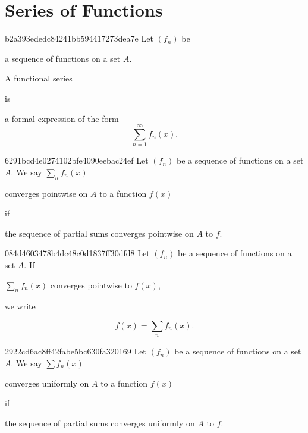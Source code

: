 \section{Series of Functions} %
\begin{note}{b2a393ededc84241bb594417273dea7e}
    Let \({ (f_n) }\) be \begin{icloze}{3}a sequence of functions on a set \({ A }\).\end{icloze}
    \begin{icloze}{2}A functional series\end{icloze} is
    \begin{icloze}{1}
        a formal expression of the form
        \[
            \sum_{n=1}^{\infty} f_n(x).
        \]
    \end{icloze}
\end{note}

\begin{note}{6291bcd4e0274102bfe4090eebac24ef}
    Let \({ (f_n) }\) be a sequence of functions on a set \({ A }\).
    We say \({ \sum_n f_n(x) }\) \begin{icloze}{2}converges pointwise on \({ A }\) to a function \({ f(x) }\)\end{icloze} if \begin{icloze}{1}the sequence of partial sums converges pointwise on \({ A }\) to \({ f }\).\end{icloze}
\end{note}

\begin{note}{084d4603478b4dc48c0d1837ff30dfd8}
    Let \({ (f_n) }\) be a sequence of functions on a set \({ A }\).
    If \begin{icloze}{2}\({ \sum_n f_n(x) }\) converges pointwise to \({ f(x) }\),\end{icloze} we write
    \begin{icloze}{1}
        \[
            f(x) = \sum_n f_n(x).
        \]
    \end{icloze}
\end{note}

\begin{note}{2922cd6ac8ff42fabe5bc630fa320169}
    Let \({ (f_n) }\) be a sequence of functions on a set \({ A }\).
    We say \({ \sum f_n(x) }\) \begin{icloze}{2}converges uniformly on \({ A }\) to a function \({ f(x) }\)\end{icloze} if \begin{icloze}{1}the sequence of partial sums converges uniformly on \({ A }\) to \({ f }\).\end{icloze}
\end{note}

